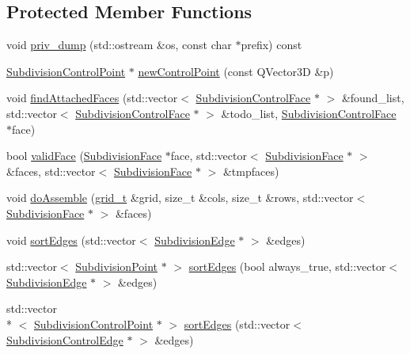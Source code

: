 \subsection*{Protected Member Functions}
\begin{DoxyCompactItemize}
\item 
void \hyperlink{classShipCADGeometry_1_1SubdivisionSurface_a5c88eb988cc6a439242264bc54a6e3e1}{priv\-\_\-dump} (std\-::ostream \&os, const char $\ast$prefix) const 
\item 
\hyperlink{classShipCADGeometry_1_1SubdivisionControlPoint}{Subdivision\-Control\-Point} $\ast$ \hyperlink{classShipCADGeometry_1_1SubdivisionSurface_a251b711125d50aa51875451976e8a8d7}{new\-Control\-Point} (const Q\-Vector3\-D \&p)
\item 
void \hyperlink{classShipCADGeometry_1_1SubdivisionSurface_a3163cfd01e0454ecb9dbb088dc76fbc6}{find\-Attached\-Faces} (std\-::vector$<$ \hyperlink{classShipCADGeometry_1_1SubdivisionControlFace}{Subdivision\-Control\-Face} $\ast$ $>$ \&found\-\_\-list, std\-::vector$<$ \hyperlink{classShipCADGeometry_1_1SubdivisionControlFace}{Subdivision\-Control\-Face} $\ast$ $>$ \&todo\-\_\-list, \hyperlink{classShipCADGeometry_1_1SubdivisionControlFace}{Subdivision\-Control\-Face} $\ast$face)
\item 
bool \hyperlink{classShipCADGeometry_1_1SubdivisionSurface_a5b6204bb0648f2e85cbf07ffbac4bd42}{valid\-Face} (\hyperlink{classShipCADGeometry_1_1SubdivisionFace}{Subdivision\-Face} $\ast$face, std\-::vector$<$ \hyperlink{classShipCADGeometry_1_1SubdivisionFace}{Subdivision\-Face} $\ast$ $>$ \&faces, std\-::vector$<$ \hyperlink{classShipCADGeometry_1_1SubdivisionFace}{Subdivision\-Face} $\ast$ $>$ \&tmpfaces)
\item 
void \hyperlink{classShipCADGeometry_1_1SubdivisionSurface_ac322d8008ea13bc3ca3fd1baeab7e1b3}{do\-Assemble} (\hyperlink{classShipCADGeometry_1_1SubdivisionSurface_a360ddace48a5d6827e99a21e78a6c458}{grid\-\_\-t} \&grid, size\-\_\-t \&cols, size\-\_\-t \&rows, std\-::vector$<$ \hyperlink{classShipCADGeometry_1_1SubdivisionFace}{Subdivision\-Face} $\ast$ $>$ \&faces)
\item 
void \hyperlink{classShipCADGeometry_1_1SubdivisionSurface_a2b270b878bb810d51bd7adf689db5366}{sort\-Edges} (std\-::vector$<$ \hyperlink{classShipCADGeometry_1_1SubdivisionEdge}{Subdivision\-Edge} $\ast$ $>$ \&edges)
\item 
std\-::vector$<$ \hyperlink{classShipCADGeometry_1_1SubdivisionPoint}{Subdivision\-Point} $\ast$ $>$ \hyperlink{classShipCADGeometry_1_1SubdivisionSurface_abbabb02057a2e66d2a37ec84696788e9}{sort\-Edges} (bool always\-\_\-true, std\-::vector$<$ \hyperlink{classShipCADGeometry_1_1SubdivisionEdge}{Subdivision\-Edge} $\ast$ $>$ \&edges)
\item 
std\-::vector\\*
$<$ \hyperlink{classShipCADGeometry_1_1SubdivisionControlPoint}{Subdivision\-Control\-Point} $\ast$ $>$ \hyperlink{classShipCADGeometry_1_1SubdivisionSurface_a8650bf95c9eb2de0e0b1342bfacbe82a}{sort\-Edges} (std\-::vector$<$ \hyperlink{classShipCADGeometry_1_1SubdivisionControlEdge}{Subdivision\-Control\-Edge} $\ast$ $>$ \&edges)
\end{DoxyCompactItemize}
